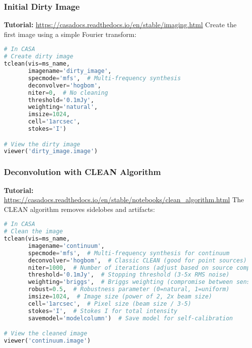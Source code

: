 \documentclass[11pt]{article}
\begin{document}
\subsubsection{Initial Dirty Image}
\textbf{Tutorial:} \url{https://casadocs.readthedocs.io/en/stable/imaging.html}
Create the first image using a simple Fourier transform:

\begin{lstlisting}[language=Python]
# In CASA
# Create dirty image
tclean(vis=ms_name, 
       imagename='dirty_image',
       specmode='mfs',  # Multi-frequency synthesis
       deconvolver='hogbom',
       niter=0,  # No cleaning
       threshold='0.1mJy',
       weighting='natural',
       imsize=1024,
       cell='1arcsec',
       stokes='I')

# View the dirty image
viewer('dirty_image.image')
\end{lstlisting}

\subsubsection{Deconvolution with CLEAN Algorithm}
\textbf{Tutorial:} \url{https://casadocs.readthedocs.io/en/stable/notebooks/clean\_algorithm.html}
The CLEAN algorithm removes sidelobes and artifacts:

\begin{lstlisting}[language=Python]
# In CASA
# Clean the image
tclean(vis=ms_name, 
       imagename='continuum',
       specmode='mfs',  # Multi-frequency synthesis for continuum
       deconvolver='hogbom',  # Classic CLEAN (good for point sources)
       niter=1000,  # Number of iterations (adjust based on source complexity)
       threshold='0.1mJy',  # Stopping threshold (3-5x RMS noise)
       weighting='briggs',  # Briggs weighting (compromise between sensitivity/resolution)
       robust=0.5,  # Robustness parameter (0=natural, 1=uniform)
       imsize=1024,  # Image size (power of 2, 2x beam size)
       cell='1arcsec',  # Pixel size (beam size / 3-5)
       stokes='I',  # Stokes I for total intensity
       savemodel='modelcolumn')  # Save model for self-calibration

# View the cleaned image
viewer('continuum.image')
\end{lstlisting}
\end{document}
